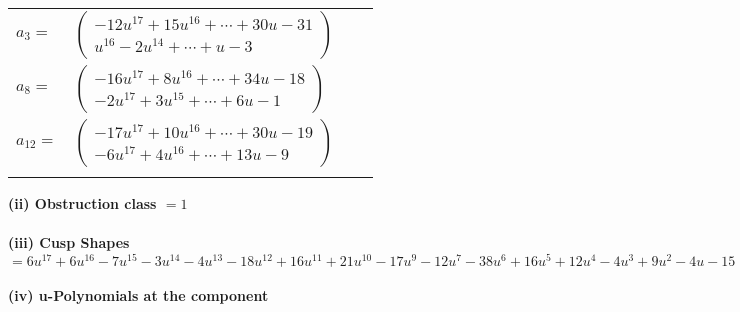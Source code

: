 \documentclass[1p]{elsarticle_modified}
\theoremstyle{definition}
\begin{document}
\begin{tabular}{m{7pt} m{180pt} m{7pt} m{180pt} }
\flushright $a_{3}=$&$\begin{pmatrix}-12 u^{17}+15 u^{16}+\cdots+30 u-31\\u^{16}-2 u^{14}+\cdots+u-3\end{pmatrix}$ \\
\flushright $a_{8}=$&$\begin{pmatrix}-16 u^{17}+8 u^{16}+\cdots+34 u-18\\-2 u^{17}+3 u^{15}+\cdots+6 u-1\end{pmatrix}$ \\
\flushright $a_{12}=$&$\begin{pmatrix}-17 u^{17}+10 u^{16}+\cdots+30 u-19\\-6 u^{17}+4 u^{16}+\cdots+13 u-9\end{pmatrix}$\\&\end{tabular}
\flushleft \textbf{(ii) Obstruction class $= 1$}\\~\\
\flushleft \textbf{(iii) Cusp Shapes $= 6 u^{17}+6 u^{16}-7 u^{15}-3 u^{14}-4 u^{13}-18 u^{12}+16 u^{11}+21 u^{10}-17 u^9-12 u^7-38 u^6+16 u^5+12 u^4-4 u^3+9 u^2-4 u-15$}\\~\\
\newpage\renewcommand{\arraystretch}{1}
\flushleft \textbf{(iv) u-Polynomials at the component}\newline \\
\end{document}
